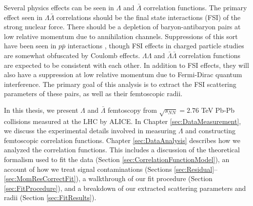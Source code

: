 

Several physics effects can be seen in $\Lambda$ and $\bar{\Lambda}$ correlation functions.
The primary effect seen in $\Lambda\bar{\Lambda}$ correlations should be the final state interactions (FSI) of the strong nuclear force.  
There should be a depletion of baryon-antibaryon pairs at low relative momentum due to annihilation channels.
Suppressions of this sort have been seen in $p \bar{p}$ interactions \cite{Gos:2007cj,Adamczyk:2015hza}, though FSI effects in charged particle studies are somewhat obfuscated by Coulomb effects.  
$\Lambda\Lambda$ and $\bar{\Lambda}\bar{\Lambda}$ correlation functions are expected to be consistent with each other.
In addition to FSI effects, they will also have a suppression at low relative momentum due to Fermi-Dirac quantum interference.
The primary goal of this analysis is to extract the FSI scattering parameters of these pairs, as well as their femtoscopic radii.


In this thesis, we present $\Lambda$ and $\bar{\Lambda}$ femtoscopy from $\sqrt{s_{NN}}=2.76$ TeV Pb-Pb collisions measured at the LHC by ALICE.
In Chapter \ref{sec:DataMeasurement}, we discuss the experimental details involved in measuring $\Lambda$ and constructing femtoscopic correlation functions.
Chapter \ref{sec:DataAnalysis} describes how we analyzed the correlation functions.
This includes a discussion of the theoretical formalism used to fit the data (Section \ref{sec:CorrelationFunctionModel}), an account of how we treat signal contaminations (Sections \ref{sec:Residual}--\ref{sec:MomResCorrectFit}), a walkthrough of our fit procedure (Section \ref{sec:FitProcedure}), and a breakdown of our extracted scattering parameters and radii (Section \ref{sec:FitResults}).





